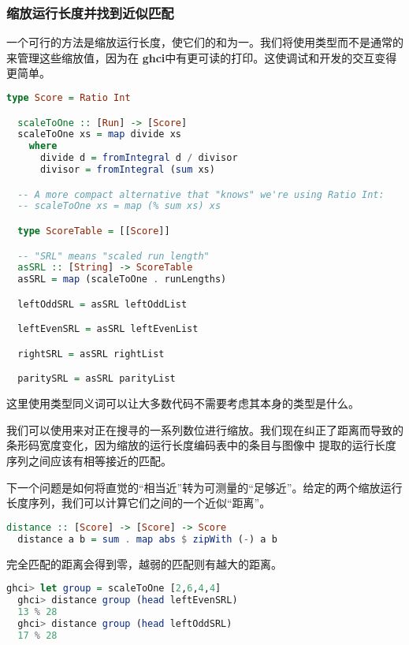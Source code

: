 \documentclass[./main.tex]{subfiles}
\begin{document}
\subsubsection*{缩放运行长度并找到近似匹配}

一个可行的方法是缩放运行长度，使它们的和为一。我们将使用类型而不是通常的来管理这些缩放值，因为在
\textbf{ghci}中有更可读的打印。这使调试和开发的交互变得更简单。

\begin{lstlisting}[language=Haskell]
  type Score = Ratio Int

  scaleToOne :: [Run] -> [Score]
  scaleToOne xs = map divide xs
    where
      divide d = fromIntegral d / divisor
      divisor = fromIntegral (sum xs)

  -- A more compact alternative that "knows" we're using Ratio Int:
  -- scaleToOne xs = map (% sum xs) xs

  type ScoreTable = [[Score]]

  -- "SRL" means "scaled run length"
  asSRL :: [String] -> ScoreTable
  asSRL = map (scaleToOne . runLengths)

  leftOddSRL = asSRL leftOddList

  leftEvenSRL = asSRL leftEvenList

  rightSRL = asSRL rightList

  paritySRL = asSRL parityList
\end{lstlisting}

这里使用类型同义词可以让大多数代码不需要考虑其本身的类型是什么。

我们可以使用来对正在搜寻的一系列数位进行缩放。我们现在纠正了距离而导致的条形码宽度变化，因为缩放的运行长度编码表中的条目与图像中
提取的运行长度序列之间应该有相等接近的匹配。

下一个问题是如何将直觉的“相当近”转为可测量的“足够近”。给定的两个缩放运行长度序列，我们可以计算它们之间的一个近似“距离”。

\begin{lstlisting}[language=Haskell]
  distance :: [Score] -> [Score] -> Score
  distance a b = sum . map abs $ zipWith (-) a b
\end{lstlisting}

完全匹配的距离会得到零，越弱的匹配则有越大的距离。

\begin{lstlisting}[language=Haskell]
  ghci> let group = scaleToOne [2,6,4,4]
  ghci> distance group (head leftEvenSRL)
  13 % 28
  ghci> distance group (head leftOddSRL)
  17 % 28
\end{lstlisting}
\end{document}

